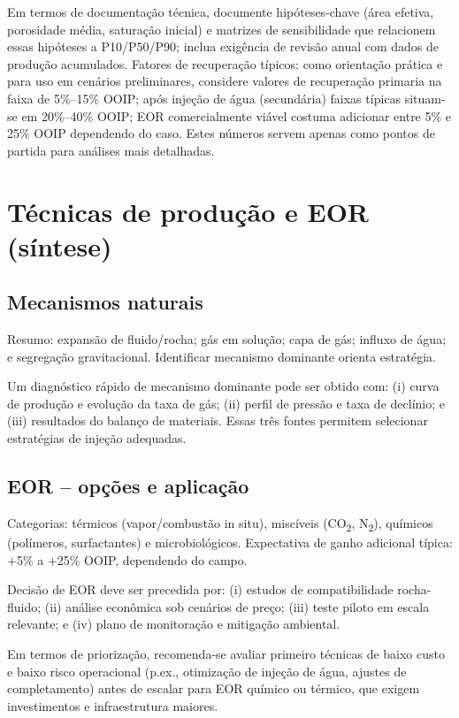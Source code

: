 \documentclass[
  12pt,
  a4paper,
  oneside,
  brazilian,
  sumario=tradicional
]{abntex2}
\begin{document}
Em termos de documentação técnica, documente hipóteses-chave (área efetiva,
porosidade média, saturação inicial) e matrizes de sensibilidade que relacionem
essas hipóteses a P10/P50/P90; inclua exigência de revisão anual com dados de
produção acumulados.
Fatores de recuperação típicos: como orientação prática e para uso em cenários
preliminares, considere valores de recuperação primaria na faixa de 5\%--15\% OOIP;
após injeção de água (secundária) faixas típicas situam-se em 20\%--40\% OOIP;
EOR comercialmente viável costuma adicionar entre 5\% e 25\% OOIP dependendo do
caso. Estes números servem apenas como pontos de partida para análises mais
detalhadas.

\chapter{Técnicas de produção e EOR (síntese)}
\section{Mecanismos naturais}
Resumo: expansão de fluido/rocha; gás em solução; capa de gás; influxo de água;
e segregação gravitacional. Identificar mecanismo dominante orienta estratégia.

Um diagnóstico rápido de mecanismo dominante pode ser obtido com: (i) curva de
produção e evolução da taxa de gás; (ii) perfil de pressão e taxa de declínio;
e (iii) resultados do balanço de materiais. Essas três fontes permitem selecionar
estratégias de injeção adequadas.

\section{EOR -- opções e aplicação}
Categorias: térmicos (vapor/combustão in situ), miscíveis (CO\textsubscript{2}, N\textsubscript{2}), químicos (polímeros, surfactantes) e microbiológicos.
Expectativa de ganho adicional típica: +5\% a +25\% OOIP, dependendo do campo.

Decisão de EOR deve ser precedida por: (i) estudos de compatibilidade rocha-fluido;
(ii) análise econômica sob cenários de preço; (iii) teste piloto em escala
relevante; e (iv) plano de monitoração e mitigação ambiental.

Em termos de priorização, recomenda-se avaliar primeiro técnicas de baixo custo
e baixo risco operacional (p.ex., otimização de injeção de água, ajustes de
completamento) antes de escalar para EOR químico ou térmico, que exigem
investimentos e infraestrutura maiores.
\end{document}

